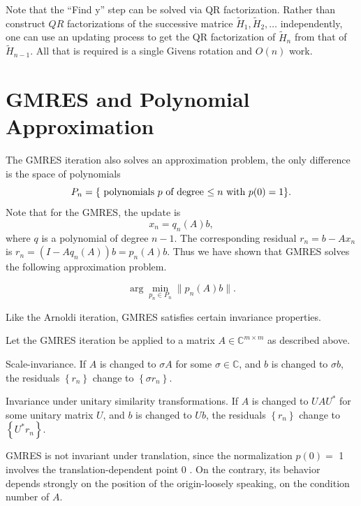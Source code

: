 Note that the ``Find y'' step can be solved via QR factorization. Rather than construct $ QR $ factorizations of the successive matrice $ \tilde H_1, \tilde H_2,\ldots  $ independently, one can use an updating process to get the QR factorization of $ \tilde H_n $ from that of $ \tilde H_{n-1} $.  All that is required is a single Givens rotation and $ O(n) $ work.  

\section{GMRES and Polynomial Approximation} 
The GMRES iteration also solves an approximation problem, the only difference is the space of polynomials 
\[
    P_n = \{\text{ polynomials $ p $ of degree $ \le n $ with  }p(0)=1\} . 
\] 
Note that for the GMRES, the update is 
\[
    x_n = q_n(A)b,
\]
where $ q $ is a polynomial of degree $ n-1 $. The corresponding residual $ r_n = b-A x_n $ is $ r_n = (I- Aq_n(A))b = p_n(A)b $.  Thus we have shown that GMRES solves the following approximation problem. 


\begin{example}
\label{eg: GMRES Approximation problem}
\[
    \arg \min_{p_n \in P_n} \|p_n(A)b\|. 
\]
\end{example}

Like the Arnoldi iteration, GMRES satisfies certain invariance properties. 


\begin{theorem}
\label{thm: Properties of GMRES}
Let the GMRES iteration be applied to a matrix $A \in \mathbb{C}^{m \times m}$ as described above.

Scale-invariance. If $A$ is changed to $\sigma A$ for some $\sigma \in \mathbb{C}$, and $b$ is changed to $\sigma b$, the residuals $\left\{r_n\right\}$ change to $\left\{\sigma r_n\right\}$.

Invariance under unitary similarity transformations. If $A$ is changed to $U A U^*$ for some unitary matrix $U$, and $b$ is changed to $U b$, the residuals $\left\{r_n\right\}$ change to $\left\{U^* r_n\right\}$.
\end{theorem}

GMRES is not invariant under translation, since the normalization $p(0)=$ 1 involves the translation-dependent point 0 . On the contrary, its behavior depends strongly on the position of the origin-loosely speaking, on the condition number of $A$.

